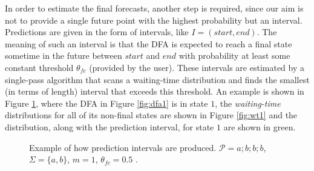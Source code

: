 In order to estimate the final forecasts, another step is required,
since our aim is not to provide a single future point with the highest probability but an interval. 
Predictions are given in the form of intervals, like $I=(\mathit{start},\mathit{end})$. 
The meaning of such an interval is that the DFA is expected to reach a final state sometime in the future between $\mathit{start}$ and $\mathit{end}$ with probability at least some constant threshold $\theta_{fc}$ (provided by the user). 
These intervals are estimated by a single-pass algorithm that scans a waiting-time distribution and finds the smallest (in terms of length) interval that exceeds this threshold. 
An example is shown in Figure \ref{fig:wtdfas},
where the DFA in Figure \ref{fig:dfa1} is in state $1$,
the \textit{waiting-time} distributions for all of its non-final states are shown in Figure \ref{fig:wt1}
and the distribution, along with the prediction interval, for state $1$ are shown in green.
\begin{figure}[!ht]
\begin{centering}
\caption{Example of how prediction intervals are produced. 
$\mathcal{P}=a ; b ; b ; b$, $\Sigma=\{a,b\}$, $m=1$, $\theta_{\mathit{fc}}=0.5$      \cite{alevizos2017event}.}
\label{fig:wtdfas}
\end{centering}
\end{figure}

